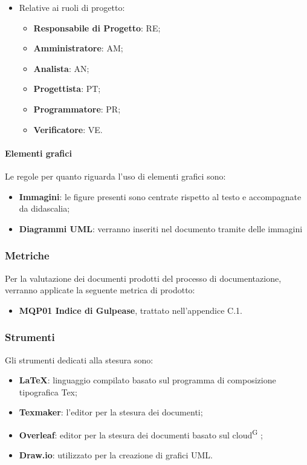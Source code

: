 \begin{itemize}
\begin{itemize}
    \item Relative ai ruoli di progetto:
        \begin{itemize}
        \item \textbf{Responsabile di Progetto}: RE;
        \item \textbf{Amministratore}: AM;
        \item \textbf{Analista}: AN;
        \item \textbf{Progettista}: PT;
        \item \textbf{Programmatore}: PR;
        \item \textbf{Verificatore}: VE.
        \end{itemize}
    \end{itemize}
\end{itemize}

\paragraph{Elementi grafici}
Le regole per quanto riguarda l’uso di elementi grafici sono:
\begin{itemize}
\item \textbf{Immagini}: le figure presenti sono centrate rispetto al testo e accompagnate da didascalia;
\item \textbf{Diagrammi UML}: verranno inseriti nel documento tramite delle immagini
\end{itemize}

\subsubsection{Metriche}
Per la valutazione dei documenti prodotti del processo di documentazione, verranno applicate la seguente metrica di prodotto:
\begin{itemize}
\item \textbf{MQP01 Indice di Gulpease}, trattato nell'appendice C.1. 
\end{itemize}

\subsubsection{Strumenti}
Gli strumenti dedicati alla stesura sono:
\begin{itemize}
\item \textbf{\LaTeX}: linguaggio compilato basato sul programma di composizione tipografica Tex;
\item \textbf{Texmaker}: l’editor per la stesura dei documenti;
\item \textbf{Overleaf}: editor per la stesura dei documenti basato sul cloud\textsuperscript{G} ;
\item \textbf{Draw.io}: utilizzato per la creazione di grafici UML. 
\end{itemize}

